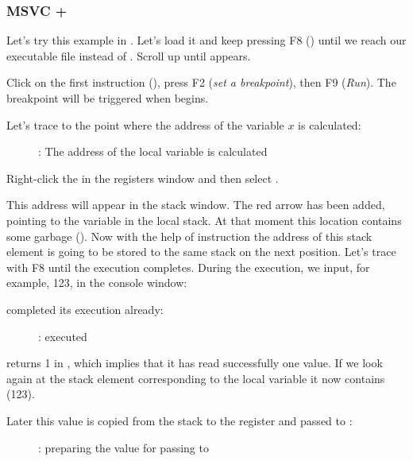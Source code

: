 \clearpage
\subsubsection{MSVC + \olly}
\myindex{\olly}

Let's try this example in \olly.
Let's load it and keep pressing F8 (\stepover) until we reach our executable file instead of .
Scroll up until \main appears.

Click on the first instruction (), press F2 (\emph{set a breakpoint}), then F9 (\emph{Run}).
The breakpoint will be triggered when \main begins.

Let's trace to the point where the address of the variable $x$ is calculated:

\begin{figure}[H]
\centering
{}
\caption{\olly: The address of the local variable is calculated}
\label{fig:scanf_ex1_olly_1}
\end{figure}

Right-click the \EAX in the registers window and then select .

This address will appear in the stack window.
The red arrow has been added, pointing to the variable in the local stack.
At that moment this location contains some garbage ().
Now with the help of \PUSH instruction the address of this stack element is going to be stored to the same stack on the next position.
Let's trace with F8 until the \scanf execution completes.
During the \scanf execution, we input, for example, 123, in the console window:



\clearpage
\scanf completed its execution already:

\begin{figure}[H]
\centering
{}
\caption{\olly: \scanf executed}
\label{fig:scanf_ex1_olly_3}
\end{figure}

\scanf returns 1 in \EAX, which implies that it has read successfully one value.
If we look again at the stack element corresponding to the local variable it now contains  (123).

\clearpage

Later this value is copied from the stack to the \ECX register and passed to \printf:

\begin{figure}[H]
\centering
{}
\caption{\olly: preparing the value for passing to \printf}
\label{fig:scanf_ex1_olly_4}
\end{figure}
